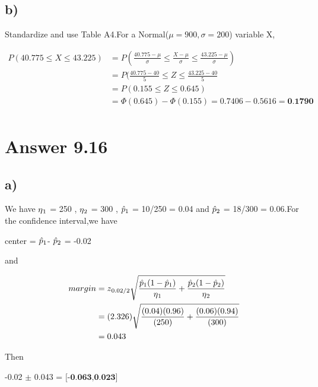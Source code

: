 \documentclass[12pt]{article}
\begin{document}
\subsection*{b)}
Standardize and use Table A4.For a Normal($\mu = 900 , \sigma = 200$) variable X,

\begin{align*}
P(40.775 \leq X \leq 43.225) &=P(\frac{40.775- \mu}{\sigma} \leq \frac{X- \mu}{\sigma} \leq \frac{43.225 - \mu}{\sigma}) \\
&=P(\frac{40.775 - 40}{5} \leq Z \leq \frac{43.225 - 40}{5}\\
&=P( 0.155 \leq Z \leq 0.645) \\
&=\Phi(0.645) - \Phi(0.155) = 0.7406 - 0.5616 = \textbf{0.1790}\\
\end{align*}

\section*{Answer 9.16}
\subsection*{a)}
We have $\eta \textsubscript{1}$ = 250 , $\eta \textsubscript{2}$ = 300 , $\hat{p}\textsubscript{1}$  = 10/250 = 0.04 and  $\hat{p}\textsubscript{2}$ = 18/300 = 0.06.For the confidence interval,we have \\
\begin{center}
center = $\hat{p}\textsubscript{1}$- $\hat{p}\textsubscript{2}$ = -0.02 \\
\end{center}
and
\begin{center}
\begin{align*}
margin &=z\textsubscript{0.02/2} \sqrt{\frac{\hat{p}\textsubscript{1} (1 - \hat{p}\textsubscript{1})}{\eta \textsubscript{1}} + \frac{\hat{p}\textsubscript{2} (1 - \hat{p}\textsubscript{2})}{\eta \textsubscript{2}}}\\
&=(2.326) \sqrt{\frac{(0.04) (0.96)}{(250)} + \frac{(0.06) (0.94)}{(300)}}\\
&=0.043\\
\end{align*}

\end{center}
Then
\begin{center}
-0.02 $\pm$ 0.043 = $\textbf{[-0.063,0.023]}$
\end{center}
\end{document}

